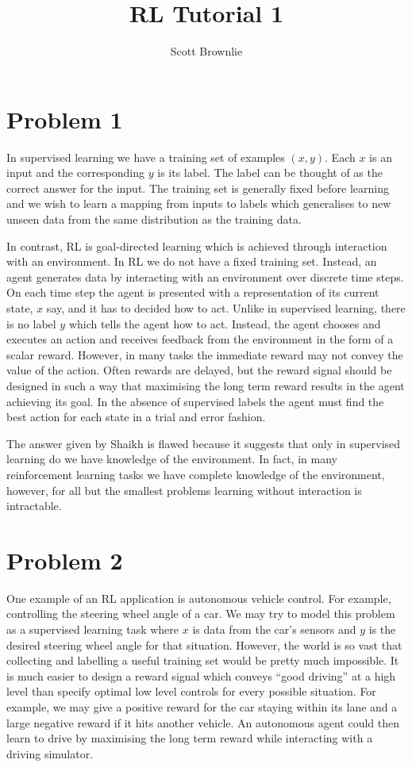 \documentclass[a4paper,11pt]{article}
\title{RL Tutorial 1}
\author{Scott Brownlie}
\date{}
\numberwithin{equation}{section}
\theoremstyle{remark}
\begin{document}
\maketitle

\section*{Problem 1}

In supervised learning we have a training set of examples $(x, y)$. Each $x$ is an input and the corresponding $y$ is its label. The label can be thought of as the correct answer for the input. The training set is generally fixed before learning and we wish to learn a mapping from inputs to labels which generalises to new unseen data from the same distribution as the training data. 

In contrast, RL is goal-directed learning which is achieved through interaction with an environment. In RL we do not have a fixed training set. Instead, an agent generates data by interacting with an environment over discrete time steps. On each time step the agent is presented with a representation of its current state, $x$ say, and it has to decided how to act. Unlike in supervised learning, there is no label $y$ which tells the agent how to act. Instead, the agent chooses and executes an action and receives feedback from the environment in the form of a scalar reward. However, in many tasks the immediate reward may not convey the value of the action. Often rewards are delayed, but the reward signal should be designed in such a way that maximising the long term reward results in the agent achieving its goal. In the absence of supervised labels the agent must find the best action for each state in a trial and error fashion.

The answer given by Shaikh is flawed because it suggests that only in supervised learning do we have knowledge of the environment. In fact, in many reinforcement learning tasks we have complete knowledge of the environment, however, for all but the smallest problems learning without interaction is intractable.  

\section*{Problem 2}

One example of an RL application is autonomous vehicle control. For example, controlling the steering wheel angle of a car. We may try to model this problem as a supervised learning task where $x$ is data from the car's sensors and $y$ is the desired steering wheel angle for that situation. 
However, the world is so vast that collecting and labelling a useful training set would be pretty much impossible. It is much easier to design a reward signal which conveys ``good driving'' at a high level than specify optimal low level controls for every possible situation. For example, we may give a positive reward for the car staying within its lane and a large negative reward if it hits another vehicle. An autonomous agent could then learn to drive by maximising the long term reward while interacting with a driving simulator. 
\end{document}
